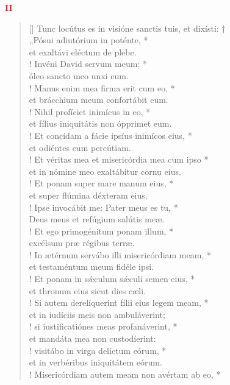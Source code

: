 \begin{center}
\textcolor{red}{\bf II}
\end{center}
\begin{verse}[\versewidth]
Tunc locútus es in visióne sanctis tuis, et dixísti: †\\
„Pósui adiutórium in poténte, *\\
et exaltávi eléctum de plebe.\\!
\vin Invéni David servum meum; *\\
\vin óleo sancto meo unxi eum.\\!
Manus enim mea firma erit cum eo, *\\
et brácchium meum confortábit eum.\\!
\vin Nihil profíciet inimícus in eo, *\\
\vin et fílius iniquitátis non ópprimet eum.\\!
Et concídam a fácie ipsíus inimícos eius, *\\
et odiéntes eum percútiam.\\!
\vin Et véritas mea et misericórdia mea cum ipso *\\
\vin et in nómine meo exaltábitur cornu eius.\\!
Et ponam super mare manum eius, *\\
et super flúmina déxteram eius.\\!
\vin Ipse invocábit me: Pater meus es tu, *\\
\vin Deus meus et refúgium salútis meæ.\\!
Et ego primogénitum ponam illum, *\\
excélsum præ régibus terræ.\\!
\vin In ætérnum servábo illi misericórdiam meam, *\\
\vin et testaméntum meum fidéle ipsi.\\!
Et ponam in s\'{æ}culum s\'{æ}culi semen eius, *\\
et thronum eius sicut dies cæli.\\!
\vin Si autem derelíquerint fílii eius legem meam, *\\
\vin et in iudíciis meis non ambuláverint;\\!
si iustificatiónes meas profanáverint, *\\
et mandáta mea non custodíerint:\\!
\vin visitábo in virga delíctum eórum, *\\
\vin et in verbéribus iniquitátem eórum.\\!
Misericórdiam autem meam non avértam ab eo, *\\

\end{verse}
